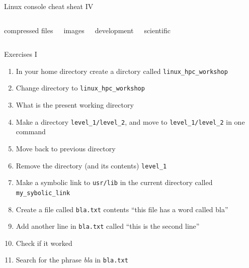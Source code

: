\documentclass{beamer}
\begin{document}
\begin{frame}[fragile]{Linux console cheat sheat IV}
  \fontsize{7pt}{7}\selectfont
  \begin{columns}
    \begin{block}{compressed files}
      
    \end{block}
    \begin{block}{images}
      
    \end{block}

    \begin{block}{development}
      
    \end{block}
    \begin{block}{scientific}
      
    \end{block}
  \end{columns}
\end{frame}

\begin{frame}{Exercises I}
  \fontsize{8pt}{8}\selectfont
  \begin{enumerate}
    \item In your home directory create a dirctory called \texttt{linux\_hpc\_workshop}
    \item Change directory to \texttt{linux\_hpc\_workshop}
    \item What is the present working directory
    \item Make a directory \texttt{level\_1/level\_2}, and move to \texttt{level\_1/level\_2} in one command
    \item Move back to previous directory
    \item Remove the directory (and its contents) \texttt{level\_1}
    \item Make a symbolic link to \texttt{usr/lib} in the current directory called \texttt{my\_sybolic\_link}
    \item Create a file called \texttt{bla.txt} contents ``this file has a word called bla''
    \item Add another line in \texttt{bla.txt} called ``this is the second line''
    \item Check if it worked
    \item Search for the phrase \emph{bla} in \texttt{bla.txt}
  \end{enumerate}
\end{frame}
\end{document}
